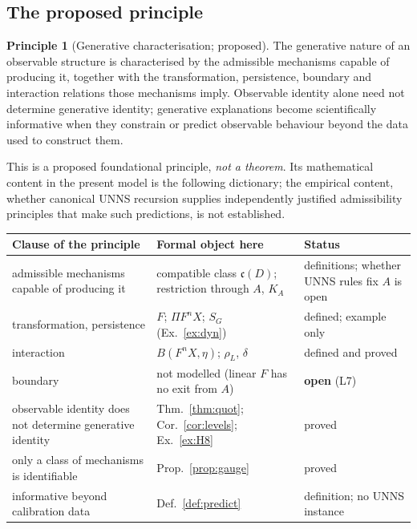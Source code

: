 \documentclass[11pt,a4paper]{article}
\newcommand{\defic}{\delta}
\theoremstyle{plain}
\theoremstyle{definition}
\newtheorem{principle}[theorem]{Principle}
\begin{document}
\subsection{The proposed principle}
\begin{principle}[Generative characterisation; proposed]\label{princ:gen}
The generative nature of an observable structure is characterised by the admissible mechanisms capable of producing it, together with the transformation, persistence, boundary and interaction relations those mechanisms imply.
Observable identity alone need not determine generative identity; generative explanations become scientifically informative when they constrain or predict observable behaviour beyond the data used to construct them.
\end{principle}
\noindent
This is a proposed foundational principle, \emph{not a theorem}. Its mathematical content in the present model is the following dictionary; the empirical content, whether canonical UNNS recursion supplies independently justified admissibility principles that make such predictions, is not established.
\begin{center}\small
\begin{tabularx}{\textwidth}{@{}>{\raggedright\arraybackslash}p{}>{\raggedright\arraybackslash}X>{\raggedright\arraybackslash}p{}@{}}
\toprule
Clause of the principle & Formal object here & Status\\
\midrule
admissible mechanisms capable of producing it & compatible class $\mathfrak c(D)$; restriction through $A$, $K_A$ & definitions; whether UNNS rules fix $A$ is open\\
transformation, persistence & $F$; $\Pi F^nX$; $S_G$ (Ex.~\ref{ex:dyn}) & defined; example only\\
interaction & $B(F^nX,\eta)$; $\rho_L$, $\defic$ & defined and proved\\
boundary & not modelled (linear $F$ has no exit from $A$) & \textbf{open} (L7)\\
observable identity does not determine generative identity & Thm.~\ref{thm:quot}; Cor.~\ref{cor:levels}; Ex.~\ref{ex:H8} & proved\\
only a class of mechanisms is identifiable & Prop.~\ref{prop:gauge} & proved\\
informative beyond calibration data & Def.~\ref{def:predict} & definition; no UNNS instance\\
\bottomrule
\end{tabularx}
\end{center}
\end{document}
